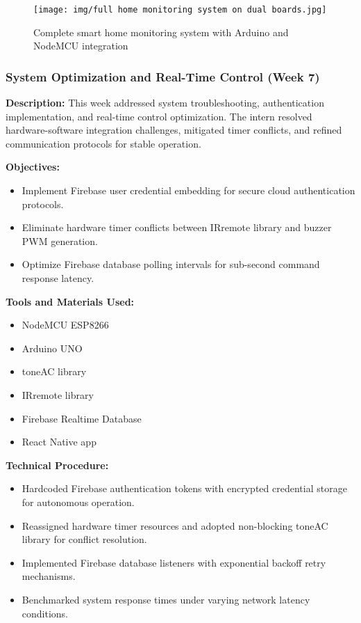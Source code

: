 \documentclass[12pt,a4paper]{report}
\begin{document}
\begin{figure}[H]
\centering
\texttt{[image: img/full home monitoring system on dual boards.jpg]}
\caption{Complete smart home monitoring system with Arduino and NodeMCU integration}
\label{fig:full-system}
\end{figure}

\subsubsection{System Optimization and Real-Time Control (Week 7)}

\textbf{Description:} This week addressed system troubleshooting, authentication implementation, and real-time control optimization. The intern resolved hardware-software integration challenges, mitigated timer conflicts, and refined communication protocols for stable operation.

\textbf{Objectives:}
\begin{itemize}
    \item Implement Firebase user credential embedding for secure cloud authentication protocols.
    \item Eliminate hardware timer conflicts between IRremote library and buzzer PWM generation.
    \item Optimize Firebase database polling intervals for sub-second command response latency.
\end{itemize}

\textbf{Tools and Materials Used:}
\begin{multicols}{2}
\begin{itemize}
    \item NodeMCU ESP8266
    \item Arduino UNO
    \item toneAC library
    \item IRremote library
    \item Firebase Realtime Database
    \item React Native app
\end{itemize}
\end{multicols}

\textbf{Technical Procedure:}
\begin{itemize}
    \item Hardcoded Firebase authentication tokens with encrypted credential storage for autonomous operation.
    \item Reassigned hardware timer resources and adopted non-blocking toneAC library for conflict resolution.
    \item Implemented Firebase database listeners with exponential backoff retry mechanisms.
    \item Benchmarked system response times under varying network latency conditions.
\end{itemize}
\end{document}
